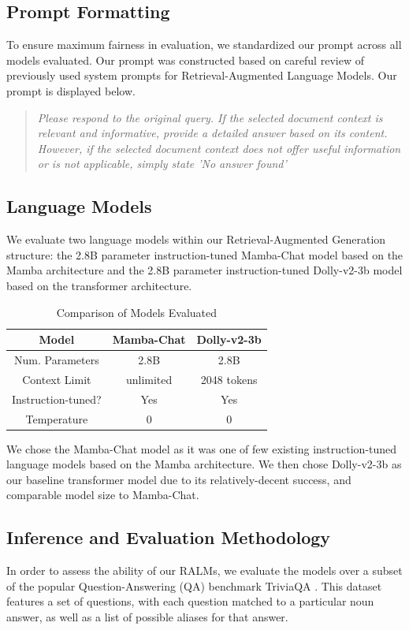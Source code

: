 \documentclass[11pt]{article}
\begin{document}
\subsection{Prompt Formatting}
To ensure maximum fairness in evaluation, we standardized our prompt across all models evaluated. Our prompt was constructed based on careful review of previously used system prompts for Retrieval-Augmented Language Models.
\newline
\newline
Our prompt is displayed below.
\begin{quote}
    \textit{Please respond to the original query. If the selected document context is relevant and informative, provide a detailed answer based on its content. However, if the selected document context does not offer useful information or is not applicable, simply state 'No answer found'}
\end{quote}
\subsection{Language Models}
We evaluate two language models within our Retrieval-Augmented Generation structure: the 2.8B parameter instruction-tuned Mamba-Chat model based on the Mamba architecture and the 2.8B parameter instruction-tuned Dolly-v2-3b model based on the transformer architecture.
\begin{table}[t]
    \centering
    \begin{tabular}{|c|c|c|} 
     \hline
     \textbf{Model} & Mamba-Chat & Dolly-v2-3b \\
     \hline\hline
     Num. Parameters & 2.8B & 2.8B \\ 
     \hline
     Context Limit & unlimited & 2048 tokens \\
     \hline
     Instruction-tuned? & Yes & Yes \\
     \hline
     Temperature & 0 & 0 \\
     \hline
    \end{tabular}
    \caption{Comparison of Models Evaluated}
    \label{tab:my_label}
\end{table}

We chose the Mamba-Chat model as it was one of few existing instruction-tuned language models based on the Mamba architecture. We then chose Dolly-v2-3b as our baseline transformer model due to its relatively-decent success, and comparable model size to Mamba-Chat. 
\subsection{Inference and Evaluation Methodology}
In order to assess the ability of our RALMs, we evaluate the models over a subset of the popular Question-Answering (QA) benchmark TriviaQA \cite{Joshi2017TriviaQAAL}. This dataset features a set of questions, with each question matched to a particular noun answer, as well as a list of possible aliases for that answer.
\end{document}
